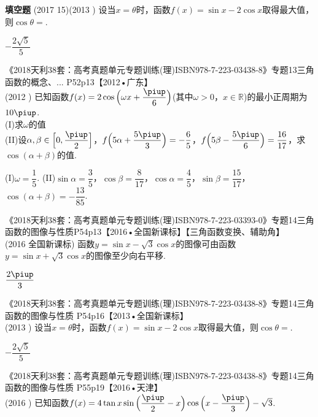 \begin{exercise}{\bf 填空题}
      (2017  15)(2013 )
      设当$x=\theta$时，函数$f(x)=\sin x-2\cos x$取得最大值，则$\cos\theta=$\tk.
      \begin{answer}
        $-\dfrac{2\sqrt{5}}5$
      \end{answer}
    \item 《2018天利38套：高考真题单元专题训练(理)ISBN978-7-223-03438-8》专题13三角函数的概念、...  P52p13【2012•广东】\\
      (2012 )
      已知函数$f(x)=2\cos{\Bigl(\omega x+\dfrac{\piup}6\Bigr)}$(其中$\omega>0$，$x\in\mathbb{R}$)的最小正周期为$10\piup$.\\
      (I)求$\omega$的值\\
      (II)设$\alpha,\beta\in\Bigl[0,\dfrac{\piup}2\Bigr]$，$f{\Bigl(5\alpha+\dfrac{5\piup}3\Bigr)}=-\dfrac{6}5$，$f{\Bigl(5\beta-\dfrac{5\piup}6\Bigr)}=\dfrac{16}{17}$，求$\cos{(\alpha+\beta)}$的值.
      \begin{answer}
        (I)$\omega=\dfrac{1}5$.
        (II)$\sin\alpha=\dfrac{3}5$，$\cos\beta=\dfrac{8}{17}$，$\cos\alpha=\dfrac{4}5$，$\sin\beta=\dfrac{15}{17}$，$\cos{(\alpha+\beta)}=-\dfrac{13}{85}$.
      \end{answer}
    \item 《2018天利38套：高考真题单元专题训练(理)ISBN978-7-223-03393-0》专题14三角函数的图像与性质P54p13【2016•全国新课标】【三角函数变换、辅助角】\\
        {\kaishu (2016 \textbullet 全国新课标)}
        函数$y=\sin x-\sqrt3\cos x$的图像可由函数$y=\sin x+\sqrt3\cos x$的图像至少向右平移.
        \begin{answer}
          $\dfrac{2\piup}3$
        \end{answer}
    \item 《2018天利38套：高考真题单元专题训练(理)ISBN978-7-223-03438-8》专题14三角函数的图像与性质 P54p16【2013•全国新课标】\\
      (2013 )
      设当$x=\theta$时，函数$f(x)=\sin x-2\cos x$取得最大值，则$\cos\theta=$\tk.
      \begin{answer}
        $-\dfrac{2\sqrt{5}}5$
      \end{answer}
    \item 《2018天利38套：高考真题单元专题训练(理)ISBN978-7-223-03438-8》专题14三角函数的图像与性质 P55p19【2016•天津】\\
      (2016 )
      已知函数$f(x)=4\tan x\sin{\Bigl(\dfrac{\piup}2-x\Bigr)}\cos{\Bigl(x-\dfrac{\piup}3\Bigr)}-\sqrt{3}$.\\

\end{exercise}
